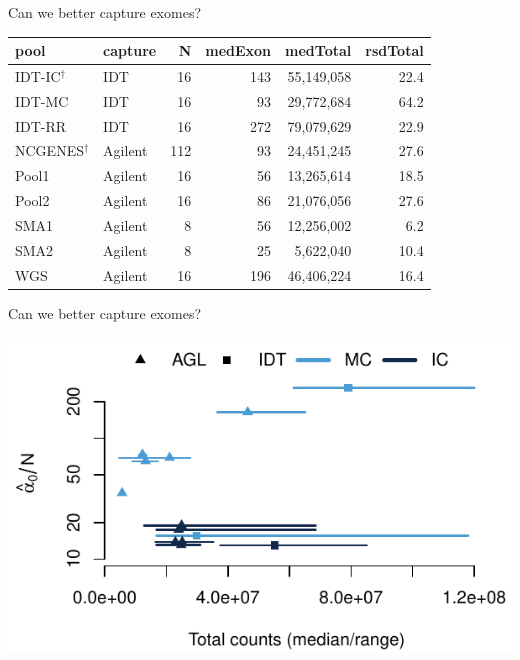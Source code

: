 \documentclass[
  10pt,
  ignorenonframetext,
  m]{beamer}
\begin{document}
\begin{frame}{Can we better capture exomes?}
\protect\hypertarget{can-we-better-capture-exomes-1}{}

\centering

\begin{tabular}{llrrrr}
\toprule
pool & capture & N & medExon & medTotal & rsdTotal\\
\midrule
IDT-IC$^\dagger$ & IDT & 16 & 143 & 55,149,058 & 22.4\\
IDT-MC & IDT & 16 & 93 & 29,772,684 & 64.2\\
IDT-RR & IDT & 16 & 272 & 79,079,629 & 22.9\\
NCGENES$^\dagger$ & Agilent & 112 & 93 & 24,451,245 & 27.6\\
Pool1 & Agilent & 16 & 56 & 13,265,614 & 18.5\\
Pool2 & Agilent & 16 & 86 & 21,076,056 & 27.6\\
SMA1 & Agilent & 8 & 56 & 12,256,002 & 6.2\\
SMA2 & Agilent & 8 & 25 & 5,622,040 & 10.4\\
WGS & Agilent & 16 & 196 & 46,406,224 & 16.4\\
\bottomrule
\end{tabular}

\end{frame}

\begin{frame}{Can we better capture exomes?}
\protect\hypertarget{can-we-better-capture-exomes-2}{}

\begin{center}\includegraphics{defense_files/figure-beamer/a0plt-1} \end{center}

\end{frame}
\end{document}
